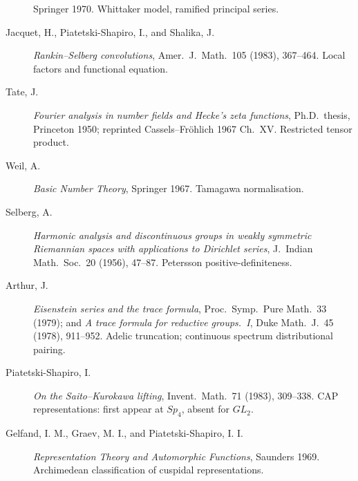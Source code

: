 \begin{description}
Springer 1970. Whittaker model, ramified principal series.
\item[Jacquet, H., Piatetski-Shapiro, I., and Shalika, J.]
\emph{Rankin--Selberg convolutions}, Amer.~J.~Math.~105 (1983),
367--464. Local factors and functional equation.
\item[Tate, J.]
\emph{Fourier analysis in number fields and Hecke's zeta functions},
Ph.D.~thesis, Princeton 1950; reprinted Cassels--Fr\"ohlich 1967
Ch.~XV. Restricted tensor product.
\item[Weil, A.]
\emph{Basic Number Theory}, Springer 1967. Tamagawa normalisation.
\item[Selberg, A.]
\emph{Harmonic analysis and discontinuous groups in weakly symmetric
Riemannian spaces with applications to Dirichlet series}, J.~Indian
Math.~Soc.~20 (1956), 47--87. Petersson positive-definiteness.
\item[Arthur, J.]
\emph{Eisenstein series and the trace formula}, Proc.~Symp.~Pure
Math.~33 (1979); and \emph{A trace formula for reductive groups.~I},
Duke Math.~J.~45 (1978), 911--952. Adelic truncation; continuous
spectrum distributional pairing.
\item[Piatetski-Shapiro, I.]
\emph{On the Saito--Kurokawa lifting}, Invent.~Math.~71 (1983),
309--338. CAP representations: first appear at \(Sp_{4}\), absent for
\(GL_{2}\).
\item[Gelfand, I. M., Graev, M. I., and Piatetski-Shapiro, I. I.]
\emph{Representation Theory and Automorphic Functions}, Saunders
1969. Archimedean classification of cuspidal representations.
\end{description}
